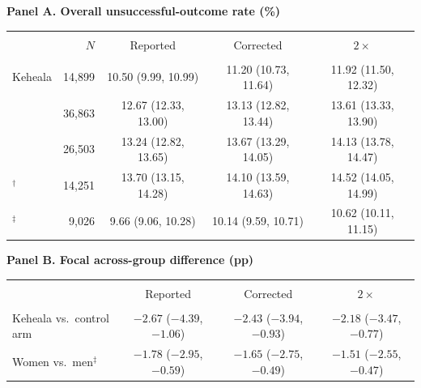 \textbf{Panel A. Overall unsuccessful-outcome rate (\%)}\\[3pt]
\begin{tabular}{l r ccc}
\hline\hline \\[-8pt]
 & $N$ & Reported & Corrected & $2\times$ \\
\hline \\[-8pt]
Keheala\cite{yoeli2026digital} & 14,899 & 10.50 (9.99, 10.99) & 11.20 (10.73, 11.64) & 11.92 (11.50, 12.32) \\
\citeauthor{ngari2025mortality} \citeyear{ngari2025mortality}\cite{ngari2025mortality} & 36,863 & 12.67 (12.33, 13.00) & 13.13 (12.82, 13.44) & 13.61 (13.33, 13.90) \\
\citeauthor{ngari2023burden} \citeyear{ngari2023burden}\cite{ngari2023burden} & 26,503 & 13.24 (12.82, 13.65) & 13.67 (13.29, 14.05) & 14.13 (13.78, 14.47) \\
\citeauthor{katana2022kilifi} \citeyear{katana2022kilifi}\cite{katana2022kilifi}$^{\dagger}$ & 14,251 & 13.70 (13.15, 14.28) & 14.10 (13.59, 14.63) & 14.52 (14.05, 14.99) \\
\citeauthor{kosgei2020gender} \citeyear{kosgei2020gender}\cite{kosgei2020gender}$^{\ddagger}$ & 9,026 & 9.66 (9.06, 10.28) & 10.14 (9.59, 10.71) & 10.62 (10.11, 11.15) \\
\hline\hline
\end{tabular}

\vspace{10pt}

\textbf{Panel B. Focal across-group difference (pp)}\\[3pt]
\begin{tabular}{l ccc}
\hline\hline \\[-8pt]
 & Reported & Corrected & $2\times$ \\
\hline \\[-8pt]
Keheala vs.\ control arm\cite{yoeli2026digital} & $-2.67$ ($-4.39$, $-1.06$) & $-2.43$ ($-3.94$, $-0.93$) & $-2.18$ ($-3.47$, $-0.77$) \\
Women vs.\ men\cite{kosgei2020gender}$^{\ddagger}$ & $-1.78$ ($-2.95$, $-0.59$) & $-1.65$ ($-2.75$, $-0.49$) & $-1.51$ ($-2.55$, $-0.47$) \\
\hline\hline
\end{tabular}
